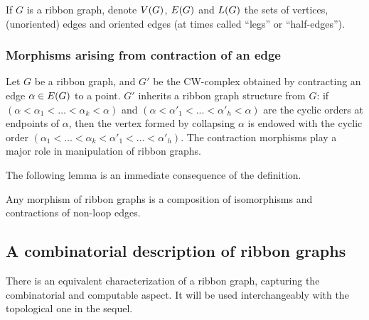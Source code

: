 If $G$ is a ribbon graph, denote $V(G)$, $E(G)$ and
$L(G)$ the sets of vertices, (unoriented) edges and oriented edges
(at times called ``legs'' or ``half-edges'').

\subsubsection{Morphisms arising from contraction of an edge}
\label{sec:contractions}
Let $G$ be a ribbon graph, and $G'$ be the CW-complex obtained by
contracting an edge $\alpha \in E(G)$ to a point.  $G'$ inherits a
ribbon graph structure from $G$: if $(\alpha < \alpha_1 < \ldots < \alpha_k < \alpha)$ and $(\alpha
< \alpha'_1 < ... < \alpha'_h < \alpha)$ are the cyclic orders at endpoints of $\alpha$,
then the vertex formed by collapsing $\alpha$ is endowed with the cyclic
order $(\alpha_1 < \ldots < \alpha_k < \alpha'_1 < \ldots < \alpha'_h)$.  The contraction morphisms
play a major role in manipulation of ribbon graphs.

The following lemma is an immediate consequence of the definition.
\begin{lemma}\label{lemma:contraction1}
  Any morphism of ribbon graphs is a composition of isomorphisms and
  contractions of non-loop edges.
\end{lemma}


\subsection{A combinatorial description of ribbon graphs}
\label{sec:rg-comb}

There is an equivalent characterization of a ribbon graph, capturing
the combinatorial and computable aspect.  It will be used
interchangeably with the topological one in the sequel.


